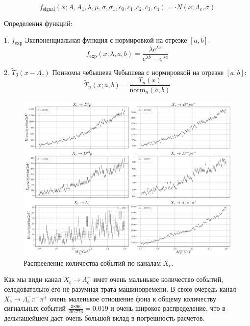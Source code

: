 \begin{equation}
f_{\text{signal}}(x; A, A_1, \lambda, \mu, \sigma, \sigma_1, c_0, c_1, c_2, c_3, c_4) = \cdot {N}(x; \Lambda_c, \sigma) 
\end{equation}

Определения функций:

1. $f_{\text{exp}}$ Экспоненциальная функция с нормировкой на отрезке $[a, b]$:
\begin{equation}
f_{\text{exp}}(x; \lambda, a, b) = \frac{\lambda e^{\lambda x}}{e^{\lambda b} - e^{\lambda a}}
\end{equation}

2. $\tilde T_0(x - \Lambda_c)$ Поиномы чебышева Чебышева с нормировкой на отрезке $[a,b]$:
\begin{equation}
\tilde T_n(x; a, b) = \frac{T_n(x)}{\text{norm}_n(a, b)}
\end{equation}


\begin{figure}[H]
    \centering
    \includegraphics[width=1\linewidth]{img/all_chan_sv.png}
    \caption{Распрееление количества событий по каналам $X_c$.}
\end{figure}

Как мы види канал $X_c \to \Lambda_c^-$ имет очень мальнькое количество событий, 
селедовательно его не разумная трата машиновремени. 
В свою очередь канал $X_c \to \Lambda_c^- \pi^- \pi^+$ очень маленькое отношение 
фона к общему количеству сигнальных событий $\frac{3896}{202776}=0.019$ и очень 
широкое распределение, что в дельнашейшем даст очень большой вклад в погрешность 
расчетов.  

